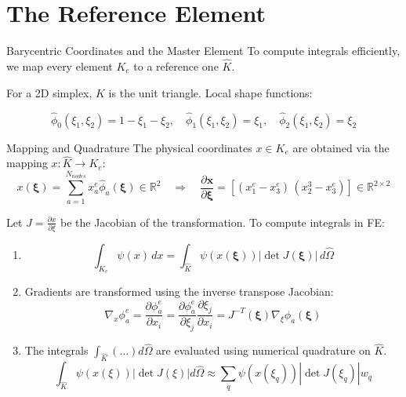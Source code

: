 \documentclass[aspectratio=169]{beamer}
\newcommand{\R}{\mathbb{R}}
\begin{document}
\section{The Reference Element}

\begin{frame}{Barycentric Coordinates and the Master Element}
    To compute integrals efficiently, we map every  element $K_e$ to a reference one $\hat{K}$.
    
    For a 2D simplex, $\hat{K}$ is the unit triangle. Local shape functions:
    
    $$ \hat{\phi}_0(\xi_1, \xi_2) = 1 - \xi_1 - \xi_2, \quad \hat{\phi}_1(\xi_1, \xi_2) = \xi_1, \quad \hat{\phi}_2(\xi_1, \xi_2) = \xi_2 $$


    \begin{center}
    \end{center}
\end{frame}

\begin{frame}{Mapping and Quadrature}
    The physical coordinates $x \in K_e$ are obtained via the mapping $x:\hat K \to K_e$:
    $$ x(\bm{\xi}) = \sum_{a=1}^{N_{nodes}} x_a^e \hat{\phi}_a(\bm{\xi})\in \R^2 \quad\Rightarrow\quad \frac{\partial \bm{x}}{\partial \bm{\xi}} = [(x_1^e - x_3^e) \, (x_2^3 - x_3^e)] \in \R^{2\times 2}$$
    
    Let $J = \frac{\partial x}{\partial \xi}$ be the Jacobian of the transformation. To compute integrals in FE: \pause
    \begin{enumerate}[<+->]
        \item  $$ \int_{K_e} \psi(x) \, dx = \int_{\hat{K}} \psi(x(\bm{\xi})) |\det J (\bm{\xi})| \, d\hat{\Omega} $$
    
        \item Gradients are transformed using the inverse transpose Jacobian:
    $$ \nabla_x \phi_a^e = \frac{\partial \phi_a^e}{\partial x_i} = \frac{\partial \phi_a^e}{\partial \xi_j}\frac{\partial \xi_j}{\partial x_i} =  J^{-T}(\bm{\xi}) \nabla_\xi \hat{\phi}_a(\bm{\xi}) $$
        \item The  integrals $\int_{\hat{K}} (\dots) d\hat{\Omega}$ are evaluated using numerical quadrature  on $\hat{K}$.
            $$ \int_{\hat{K}} \psi(x(\xi)) | \det J(\xi) | d\hat{\Omega} \approx \sum_q \psi(x(\xi_q)) | \det J(\xi_q) | w_q $$
    \end{enumerate}
\end{frame}
\end{document}
